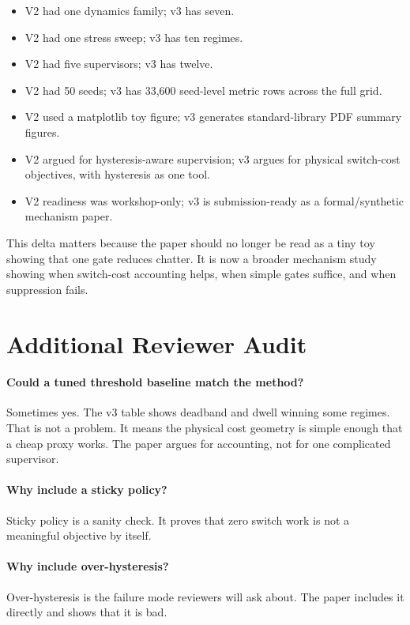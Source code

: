 \documentclass{article}
\begin{document}
\begin{itemize}
    \item V2 had one dynamics family; v3 has seven.
    \item V2 had one stress sweep; v3 has ten regimes.
    \item V2 had five supervisors; v3 has twelve.
    \item V2 had 50 seeds; v3 has 33,600 seed-level metric rows across the full grid.
    \item V2 used a matplotlib toy figure; v3 generates standard-library PDF summary figures.
    \item V2 argued for hysteresis-aware supervision; v3 argues for physical switch-cost objectives, with hysteresis as one tool.
    \item V2 readiness was workshop-only; v3 is submission-ready as a formal/synthetic mechanism paper.
\end{itemize}

This delta matters because the paper should no longer be read as a tiny toy showing that one gate reduces chatter.
It is now a broader mechanism study showing when switch-cost accounting helps, when simple gates suffice, and when suppression fails.

\section{Additional Reviewer Audit}

\paragraph{Could a tuned threshold baseline match the method?}
Sometimes yes.
The v3 table shows deadband and dwell winning some regimes.
That is not a problem.
It means the physical cost geometry is simple enough that a cheap proxy works.
The paper argues for accounting, not for one complicated supervisor.

\paragraph{Why include a sticky policy?}
Sticky policy is a sanity check.
It proves that zero switch work is not a meaningful objective by itself.

\paragraph{Why include over-hysteresis?}
Over-hysteresis is the failure mode reviewers will ask about.
The paper includes it directly and shows that it is bad.
\end{document}
